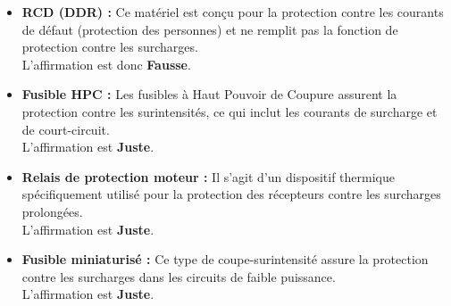 \documentclass[a4paper,11pt,answers,addpoints]{exam}
\begin{document}
\begin{questions}
\begin{solution}
	\begin{itemize}
		\item \textbf{RCD (DDR) :} Ce matériel est conçu pour la protection contre les courants de défaut (protection des personnes) et ne remplit pas la fonction de protection contre les surcharges.\\ L'affirmation est donc \textbf{Fausse}.
		\item \textbf{Fusible HPC :} Les fusibles à Haut Pouvoir de Coupure assurent la protection contre les surintensités, ce qui inclut les courants de surcharge et de court-circuit.\\
		L'affirmation est \textbf{Juste}.
		\item \textbf{Relais de protection moteur :} Il s'agit d'un dispositif thermique spécifiquement utilisé pour la protection des récepteurs contre les surcharges prolongées.\\
		L'affirmation est \textbf{Juste}.
		\item \textbf{Fusible miniaturisé :} Ce type de coupe-surintensité assure la protection contre les surcharges dans les circuits de faible puissance.\\
		L'affirmation est \textbf{Juste}.
	\end{itemize}
\end{solution}
\end{questions}
\end{document}
